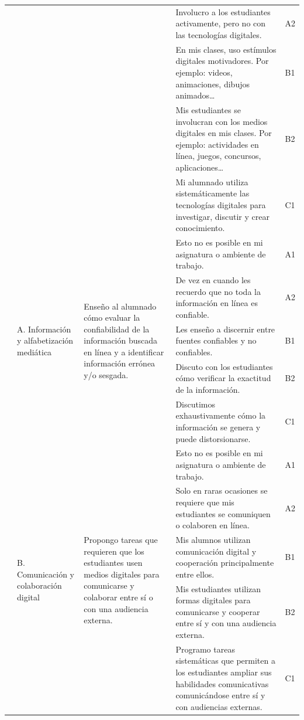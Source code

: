 \documentclass[spanish]{textolivre}
\begin{document}
\begin{small}
\begin{longtable}{
    >{\raggedright\arraybackslash}p{}
    p{}
    p{}
    p{}
    p{}
    }
\\
& & & Involucro a los estudiantes activamente, pero no con las tecnologías digitales. & A2
\\
& & & En mis clases, uso estímulos digitales motivadores. Por ejemplo: videos, animaciones, dibujos animados… & B1
\\
& & & Mis estudiantes se involucran con los medios digitales en mis clases. Por ejemplo: actividades en línea, juegos, concursos, aplicaciones… & B2
\\
& & & Mi alumnado utiliza sistemáticamente las tecnologías digitales para investigar, discutir y crear conocimiento. & C1
\\
\midrule
\multirow{15}{=}{6. Facilitar la competencia digital de los estudiantes} & \multirow{5}{=}{A. Información y alfabetización mediática} & \multirow{5}{=}{Enseño al alumnado cómo evaluar la confiabilidad de la información buscada en línea y a identificar información errónea y/o sesgada.} & Esto no es posible en mi asignatura o ambiente de trabajo. & A1
\\
& & & De vez en cuando les recuerdo que no toda la información en línea es confiable. & A2
\\
& & & Les enseño a discernir entre fuentes confiables y no confiables. & B1
\\
& & & Discuto con los estudiantes cómo verificar la exactitud de la información. & B2
\\
& & & Discutimos exhaustivamente cómo la información se genera y puede distorsionarse. & C1
\\
\cmidrule{2-5}
& \multirow{5}{=}{B. Comunicación y colaboración digital} & \multirow{5}{=}{Propongo tareas que requieren que los estudiantes usen medios digitales para comunicarse y colaborar entre sí o con una audiencia externa.} & Esto no es posible en mi asignatura o ambiente de trabajo. & A1
\\
& & & Solo en raras ocasiones se requiere que mis estudiantes se comuniquen o colaboren en línea. & A2
\\
& & & Mis alumnos utilizan comunicación digital y cooperación principalmente entre ellos. & B1
\\
& & & Mis estudiantes utilizan formas digitales para comunicarse y cooperar entre sí y con una audiencia externa. & B2
\\
& & & Programo tareas sistemáticas que permiten a los estudiantes ampliar sus habilidades comunicativas comunicándose entre sí y con audiencias externas. & C1
\\

\end{longtable}
\end{small}
\end{document}

